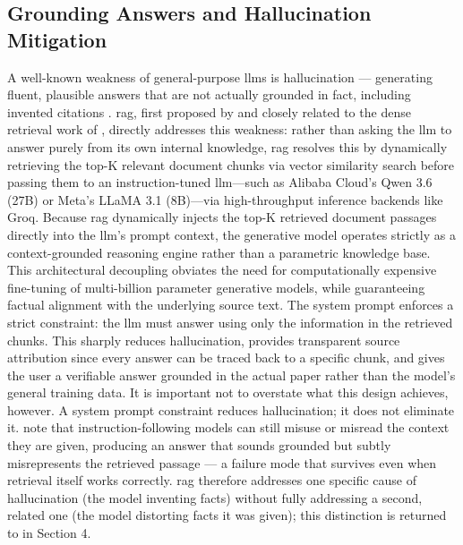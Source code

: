 \subsection{ Grounding Answers and Hallucination Mitigation}

A well-known weakness of general-purpose \gls{llm}s is hallucination — generating fluent, plausible answers that are not actually grounded in fact, including invented citations \citep{ji2023survey}. \gls{rag}, first proposed by \citet{lewis2020retrieval} and closely related to the dense retrieval work of \citet{karpukhin2020dense}, directly addresses this weakness: rather than asking the \gls{llm} to answer purely from its own internal knowledge, \gls{rag} \citep{lewis2020retrieval, karpukhin2020dense} resolves this by dynamically retrieving the top-K relevant document chunks via vector similarity search before passing them to an instruction-tuned \gls{llm}—such as Alibaba Cloud's Qwen 3.6 (27B) or Meta's LLaMA 3.1 (8B)—via high-throughput inference backends like Groq. Because \gls{rag} dynamically injects the top-K retrieved document passages directly into the \gls{llm}'s prompt context, the generative model operates strictly as a context-grounded reasoning engine rather than a parametric knowledge base. This architectural decoupling obviates the need for computationally expensive fine-tuning of multi-billion parameter generative models, while guaranteeing factual alignment with the underlying source text.
\newline \newline The system prompt enforces a strict constraint: the \gls{llm} must answer using only the information in the retrieved chunks. This sharply reduces hallucination, provides transparent source attribution since every answer can be traced back to a specific chunk, and gives the user a verifiable answer grounded in the actual paper rather than the model's general training data.
\newline \newline It is important not to overstate what this design achieves, however. A system prompt constraint reduces hallucination; it does not eliminate it. \citet{ji2023survey} note that instruction-following models can still misuse or misread the context they are given, producing an answer that sounds grounded but subtly misrepresents the retrieved passage — a failure mode that survives even when retrieval itself works correctly. \gls{rag} therefore addresses one specific cause of hallucination (the model inventing facts) without fully addressing a second, related one (the model distorting facts it was given); this distinction is returned to in Section 4.
